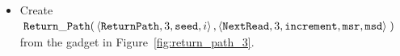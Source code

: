 \begin{itemize}
    \item Create
    $\begin{aligned}[t]
        {\tt Return\_Path}(&\left\langle {\tt ReturnPath}, 3, {\tt seed}, i                        \right\rangle,
                     \left\langle {\tt NextRead},   3, {\tt increment}, {\tt msr}, {\tt msd}\right\rangle \;)
    \end{aligned}$\\from the gadget in Figure~\ref{fig:return_path_3}.
\end{itemize}




\begin{figure}[H]
    \centering
    \hfill%

\end{figure}
